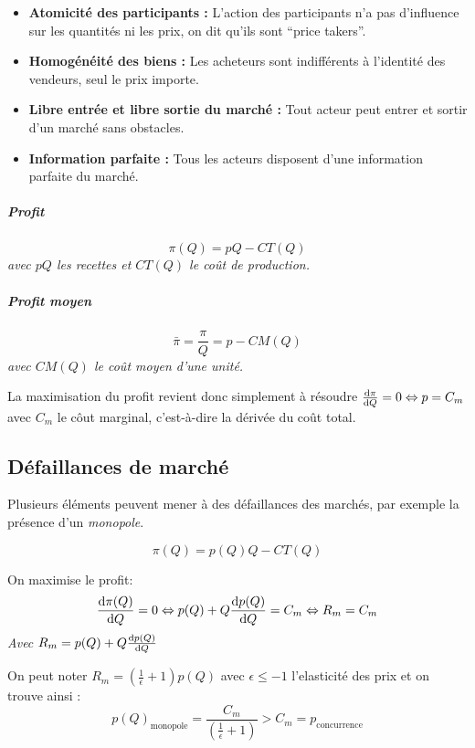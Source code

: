 \begin{itemize}[label =]
	\item \textbf{Atomicité des participants :} L'action des participants n'a pas d'influence sur les quantités ni les prix, on dit qu'ils sont ``price takers''.
	\item \textbf{Homogénéité des biens :} Les acheteurs sont indifférents à l'identité des vendeurs, seul le prix importe.
	\item \textbf{Libre entrée et libre sortie du marché :} Tout acteur peut entrer et sortir d'un marché sans obstacles.
	\item \textbf{Information parfaite :} Tous les acteurs disposent d'une information parfaite du marché.
\end{itemize}
\begin{tcolorbox}[title=Concurrence pure et parfaite]

\subparagraph{Profit} %
\label{subp:profit}

\[
	\pi(Q)= pQ-CT(Q)
\]
\emph{avec $pQ$ les recettes et $CT(Q)$ le coût de production.}

\subparagraph{Profit moyen} %
\label{subp:profit_moyen}
\[
	\bar{\pi}= \frac{\pi}{Q}= p - CM(Q)
\]
\emph{avec $CM(Q)$ le coût moyen d'une unité.}



La maximisation du profit revient donc simplement à résoudre $\frac{\operatorname{d}\! \pi}{\operatorname{d}\! Q}=0 \Leftrightarrow p=C_m$ avec $C_m$ le côut marginal, c'est-à-dire la dérivée du coût total.
\end{tcolorbox}


\subsection{Défaillances de marché} %
\label{sub:defaillances_de_marche}
Plusieurs éléments peuvent mener à des défaillances des marchés, 
par exemple la présence d'un \emph{monopole}.
\begin{tcolorbox}[title=Monopole]


\[
	\pi(Q)= p(Q)Q- CT(Q)
\]

On maximise le profit: 
\[
	\frac{\operatorname{d}\! \pi(Q)}{\operatorname{d}\! Q}=0 \Leftrightarrow p(Q)+ Q\frac{\operatorname{d}\! p(Q)}{\operatorname{d}\! Q}= C_m \Leftrightarrow R_m= C_m
\]
\emph{Avec $R_m=p(Q)+ Q\frac{\operatorname{d}\! p(Q)}{\operatorname{d}\! Q}$}

On peut noter $R_m= \left(\frac{1}{\epsilon}+1 \right)p(Q)$ avec $\epsilon \leq -1$ l'elasticité des prix et on trouve ainsi : 
\[
	p(Q)_{\text{monopole}}=\frac{C_m}{\left(\frac{1}{\epsilon}+1 \right)} > C_m=p_{\text{concurrence}}
\]
\end{tcolorbox}


